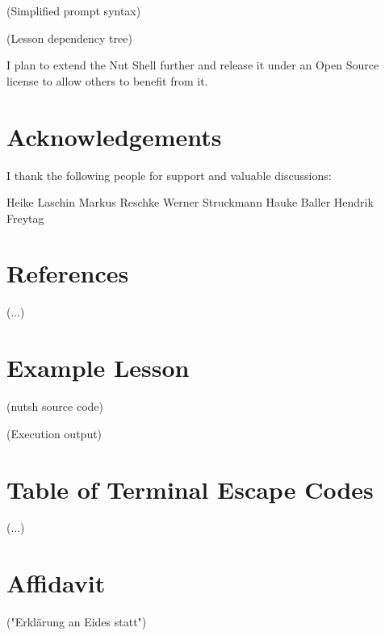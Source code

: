 \documentclass[twoside]{scrreprt}
\begin{document}
    (Simplified prompt syntax)

    (Lesson dependency tree)

I plan to extend the Nut Shell further and release it under an Open Source license to allow others to benefit from it.

\chapter{Acknowledgements}

I thank the following people for support and valuable discussions:

Heike Laschin
Markus Reschke
Werner Struckmann
Hauke Baller
Hendrik Freytag

\chapter{References}

(...)

\appendix

\chapter{Example Lesson}

(nutsh source code)

(Execution output)

\chapter{Table of Terminal Escape Codes}

(...)

\chapter*{Affidavit}

("Erklärung an Eides statt")
\end{document}

